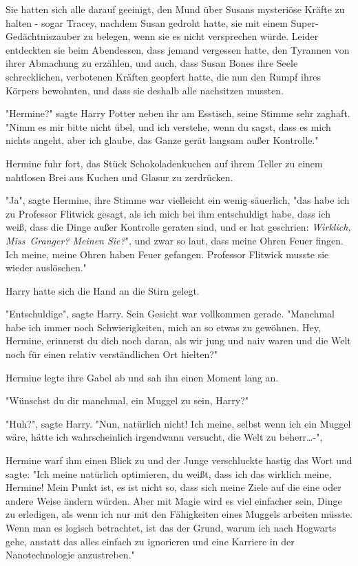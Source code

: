 {Sie hatten sich alle darauf geeinigt, den Mund über Susans mysteriöse Kräfte zu halten - sogar Tracey, nachdem Susan gedroht hatte, sie mit einem Super-Gedächtniszauber zu belegen, wenn sie es nicht versprechen würde. Leider entdeckten sie beim Abendessen, dass jemand vergessen hatte, den Tyrannen von ihrer Abmachung zu erzählen, und auch, dass Susan Bones ihre Seele schrecklichen, verbotenen Kräften geopfert hatte, die nun den Rumpf ihres Körpers bewohnten, und dass sie deshalb alle nachsitzen mussten.

"Hermine?" sagte Harry Potter neben ihr am Esstisch, seine Stimme sehr zaghaft. "Nimm es mir bitte nicht übel, und ich verstehe, wenn du sagst, dass es mich nichts angeht, aber ich glaube, das Ganze gerät langsam außer Kontrolle."

Hermine fuhr fort, das Stück Schokoladenkuchen auf ihrem Teller zu einem nahtlosen Brei aus Kuchen und Glasur zu zerdrücken.

"Ja", sagte Hermine, ihre Stimme war vielleicht ein wenig säuerlich, "das habe ich zu Professor Flitwick gesagt, als ich mich bei ihm entschuldigt habe, dass ich weiß, dass die Dinge außer Kontrolle geraten sind, und er hat geschrien: \emph{Wirklich, Miss~Granger? Meinen Sie?}", und zwar so laut, dass meine Ohren Feuer fingen. Ich meine, meine Ohren haben Feuer gefangen. Professor Flitwick musste sie wieder auslöschen."

Harry hatte sich die Hand an die Stirn gelegt.

"Entschuldige", sagte Harry. Sein Gesicht war vollkommen gerade. "Manchmal habe ich immer noch Schwierigkeiten, mich an so etwas zu gewöhnen. Hey, Hermine, erinnerst du dich noch daran, als wir jung und naiv waren und die Welt noch für einen relativ verständlichen Ort hielten?"

Hermine legte ihre Gabel ab und sah ihn einen Moment lang an.

"Wünschst du dir manchmal, ein Muggel zu sein, Harry?"

"Huh?", sagte Harry. "Nun, natürlich nicht! Ich meine, selbst wenn ich ein Muggel wäre, hätte ich wahrscheinlich irgendwann versucht, die Welt zu beherr…-",

Hermine warf ihm einen Blick zu und der Junge verschluckte hastig das Wort und sagte: "Ich meine natürlich optimieren, du weißt, dass ich das wirklich meine, Hermine! Mein Punkt ist, es ist nicht so, dass sich meine Ziele auf die eine oder andere Weise ändern würden. Aber mit Magie wird es viel einfacher sein, Dinge zu erledigen, als wenn ich nur mit den Fähigkeiten eines Muggels arbeiten müsste. Wenn man es logisch betrachtet, ist das der Grund, warum ich nach Hogwarts gehe, anstatt das alles einfach zu ignorieren und eine Karriere in der Nanotechnologie anzustreben."

}

